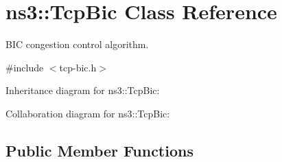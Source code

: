 \hypertarget{classns3_1_1TcpBic}{}\section{ns3\+:\+:Tcp\+Bic Class Reference}
\label{classns3_1_1TcpBic}


B\+IC congestion control algorithm.  




{\ttfamily \#include $<$tcp-\/bic.\+h$>$}



Inheritance diagram for ns3\+:\+:Tcp\+Bic\+:


Collaboration diagram for ns3\+:\+:Tcp\+Bic\+:
\subsection*{Public Member Functions}

